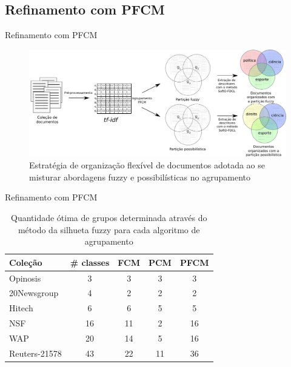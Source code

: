 \documentclass[brazil]{beamer}
\begin{document}
\subsection{Refinamento com PFCM}

\begin{frame}{Refinamento com PFCM}
  \begin{figure}[!htp] 
    \centering
    \includegraphics[width=1.0\columnwidth]{assets/process_pfcm.pdf} 
    \caption{Estratégia de organização flexível de documentos adotada ao se misturar abordagens fuzzy
    e possibilísticas no agrupamento} 
    \label{fig:flexibleorganization} 
  \end{figure}
\end{frame}

\begin{frame}{Refinamento com PFCM}
\begin{table}[!htp]
  \centering
  \begin{tabular}{ |l|c|c|c|c|}
    \hline
    {\bf Coleção} & {\bf \# classes} & {\bf FCM} & {\bf PCM} & {\bf PFCM} \\
    \hline
    Opinosis & 3 & 3 & 3 & 3 \\
    \hline
    20Newsgroup & 4 & 2 & 2 & 2 \\
    \hline
    Hitech & 6 & 6 & 5 & 5 \\
    \hline
    NSF & 16 & 11 & 2 & 16 \\
    \hline
    WAP & 20 & 14 & 5 & 16 \\
    \hline
    Reuters-21578 & 43 & 22 & 11 & 36 \\
    \hline
  \end{tabular}
  \caption{Quantidade ótima de grupos determinada através do método da silhueta fuzzy para cada
  algoritmo de agrupamento}
  \label{table:pfcmclusters}
\end{table}
\end{frame}
\end{document}
